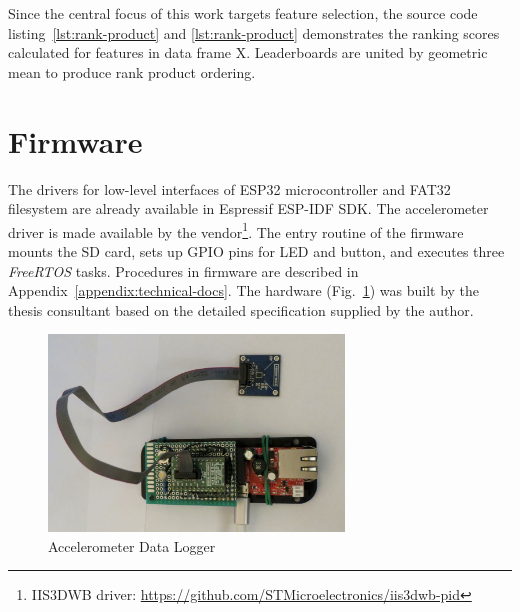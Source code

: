 Since the central focus of this work targets feature selection, the source code listing~\ref{lst:rank-product} and \ref{lst:rank-product} demonstrates the ranking scores calculated for features in data frame X. Leaderboards are united by geometric mean to produce rank product ordering.

\section{Firmware}
The drivers for low-level interfaces of ESP32 microcontroller and FAT32 filesystem are already available in Espressif ESP-IDF SDK. The accelerometer driver is made available by the vendor\footnote{IIS3DWB driver: \url{https://github.com/STMicroelectronics/iis3dwb-pid}}. The entry routine of the firmware mounts the SD card, sets up GPIO pins for LED and button, and executes three \emph{FreeRTOS} tasks. Procedures in firmware are described in Appendix~\ref{appendix:technical-docs}. The hardware (Fig.~\ref{fig:hw-data-logger}) was built by the thesis consultant based on the detailed specification supplied by the author.

\begin{figure}[h]
    \centering
    \includegraphics[width=0.7\textwidth]{assets/design/sensor/data-logger.jpg}
    \caption{Accelerometer Data Logger}
    \label{fig:hw-data-logger}
\end{figure}

